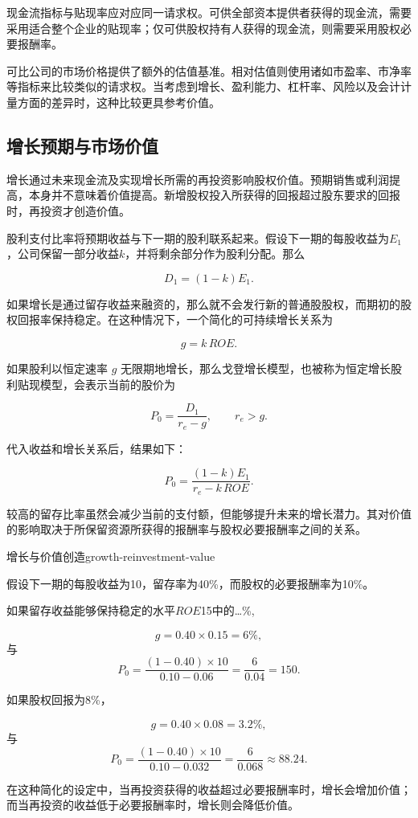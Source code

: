 现金流指标与贴现率应对应同一请求权。可供全部资本提供者获得的现金流，需要采用适合整个企业的贴现率；仅可供股权持有人获得的现金流，则需要采用股权必要报酬率。

可比公司的市场价格提供了额外的估值基准。相对估值则使用诸如市盈率、市净率等指标来比较类似的请求权。当考虑到增长、盈利能力、杠杆率、风险以及会计计量方面的差异时，这种比较更具参考价值。

\subsection{增长预期与市场价值}

增长通过未来现金流及实现增长所需的再投资影响股权价值。预期销售或利润提高，本身并不意味着价值提高。新增股权投入所获得的回报超过股东要求的回报时，再投资才创造价值。

股利支付比率将预期收益与下一期的股利联系起来。假设下一期的每股收益为$E_1$，公司保留一部分收益$k$，并将剩余部分作为股利分配。那么

\begin{equation}
D_1=(1-k)E_1.
\label{eq:ch9-dividend-payout}
\end{equation}

如果增长是通过留存收益来融资的，那么就不会发行新的普通股股权，而期初的股权回报率保持稳定。在这种情况下，一个简化的可持续增长关系为

\begin{equation}
g=k\,ROE.
\label{eq:ch9-sustainable-growth}
\end{equation}

如果股利以恒定速率
$g$ 无限期地增长，那么戈登增长模型，也被称为恒定增长股利贴现模型，会表示当前的股价为

\begin{equation}
P_0=\frac{D_1}{r_e-g},
\qquad
r_e>g.
\label{eq:ch9-gordon-growth}
\end{equation}

代入收益和增长关系后，结果如下：

\begin{equation}
P_0
=
\frac{(1-k)E_1}
{r_e-k\,ROE}.
\label{eq:ch9-growth-reinvestment-value}
\end{equation}

较高的留存比率虽然会减少当前的支付额，但能够提升未来的增长潜力。其对价值的影响取决于所保留资源所获得的报酬率与股权必要报酬率之间的关系。

\begin{example}{增长与价值创造}{growth-reinvestment-value}

假设下一期的每股收益为10，留存率为40\%，而股权的必要报酬率为10\%。

如果留存收益能够保持稳定的水平\(ROE\)15中的…\%,

\[
g=0.40\times 0.15=6\%,
\]
与
\[
P_0=\frac{(1-0.40)\times 10}{0.10-0.06}=\frac{6}{0.04}=150.
\]

如果股权回报为8\%，

\[
g=0.40\times 0.08=3.2\%,
\]
与
\[
P_0=\frac{(1-0.40)\times 10}{0.10-0.032}=\frac{6}{0.068}\approx88.24.
\]

在这种简化的设定中，当再投资获得的收益超过必要报酬率时，增长会增加价值；而当再投资的收益低于必要报酬率时，增长则会降低价值。

\end{example}

